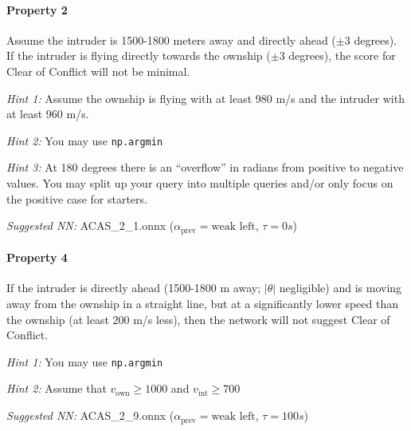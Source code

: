\documentclass[11pt,fleqn]{article}
\begin{document}
\paragraph*{Property 2}
Assume the intruder is 1500-1800 meters away and directly ahead ($\pm 3$ degrees).
If the intruder is flying directly towards the ownship ($\pm 3$ degrees),
the score for Clear of Conflict will not be minimal.

\textit{Hint 1:} Assume the ownship is flying with at least 980 m/s and the intruder with at least 960 m/s.

\textit{Hint 2:} You may use \texttt{np.argmin}

\textit{Hint 3:} At 180 degrees there is an ``overflow'' in radians from positive to negative values.
You may split up your query into multiple queries and/or only focus on the positive case for starters.

\textit{Suggested NN:} ACAS\_2\_1.onnx ($\alpha_{\text{prev}}=\text{weak left}$, $\tau=0s$)


\paragraph*{Property 4}
If the intruder is directly ahead (1500-1800 m away; $\left|\theta\right|$ negligible) and is moving away from the ownship in a straight line, but at a significantly lower speed than the ownship (at least 200 m/s less), then the network will not suggest Clear of Conflict.

\textit{Hint 1:} You may use \texttt{np.argmin}

\textit{Hint 2:} Assume that $v_{\text{own}} \geq 1000$ and $v_{\text{int}} \geq 700$

\textit{Suggested NN:} ACAS\_2\_9.onnx ($\alpha_{\text{prev}}=\text{weak left}$, $\tau=100s$)

\end{document}
